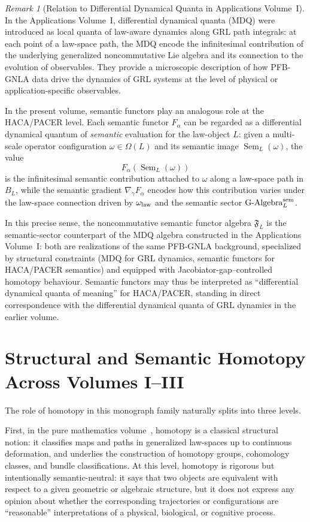 \documentclass[11pt]{book}
\theoremstyle{plain}
\theoremstyle{definition}
\theoremstyle{remark}
\newtheorem{remark}[theorem]{Remark}
\begin{document}
\begin{remark}[Relation to Differential Dynamical Quanta in Applications Volume~I]
\label{rem:semantic-functors-vs-mdq}
In the Applications Volume~I, differential dynamical quanta (MDQ) were
introduced as local quanta of law-aware dynamics along GRL path
integrals: at each point of a law-space path, the MDQ encode the
infinitesimal contribution of the underlying generalized
noncommutative Lie algebra and its connection to the evolution of
observables. They provide a microscopic description of how PFB-GNLA
data drive the dynamics of GRL systems at the level of physical or
application-specific observables.

In the present volume, semantic functors play an analogous role at the
HACA/PACER level. Each semantic functor $F_\alpha$ can be regarded as a
differential dynamical quantum of \emph{semantic} evaluation for the
law-object $L$: given a multi-scale operator configuration
$\omega\in\Omega(L)$ and its semantic image $\operatorname{Sem}_L(\omega)$,
the value
\[
  F_\alpha(\operatorname{Sem}_L(\omega))
\]
is the infinitesimal semantic contribution attached to $\omega$ along a
law-space path in $B_L$, while the semantic gradient
$\nabla_{\dot{\gamma}}F_\alpha$ encodes how this contribution varies
under the law-space connection driven by $\omega_{\mathrm{law}}$ and the semantic
sector $\text{G-Algebra}^{\mathrm{sem}}_L$.

In this precise sense, the noncommutative semantic functor algebra
$\mathfrak{F}_L$ is the semantic-sector counterpart of the MDQ algebra
constructed in the Applications Volume~I: both are realizations of the
same PFB-GNLA background, specialized by structural constraints
(MDQ for GRL dynamics, semantic functors for HACA/PACER semantics) and
equipped with Jacobiator-gap–controlled homotopy behaviour. Semantic
functors may thus be interpreted as ``differential dynamical quanta of
meaning'' for HACA/PACER, standing in direct correspondence with the
differential dynamical quanta of GRL dynamics in the earlier volume.

\end{remark}

\section{Structural and Semantic Homotopy Across Volumes I--III}


The role of homotopy in this monograph family naturally splits into three
levels.

First, in the pure mathematics volume~\cite{GaoZheng2025GFramework}, homotopy is a classical structural
notion: it classifies maps and paths in generalized law-spaces up to
continuous deformation, and underlies the construction of homotopy groups,
cohomology classes, and bundle classifications. At this level, homotopy is
rigorous but intentionally semantic-neutral: it says that two objects are
equivalent with respect to a given geometric or algebraic structure, but
it does not express any opinion about whether the corresponding
trajectories or configurations are ``reasonable'' interpretations of a
physical, biological, or cognitive process.
\end{document}
